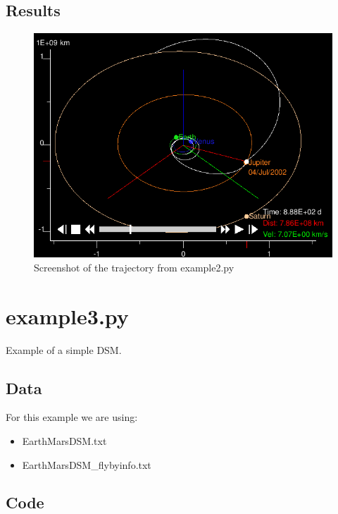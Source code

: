 \documentclass[a4paper,11pt]{article}
\begin{document}
\subsection{Results}
\begin{figure}[H]
\centering
\includegraphics[width=1\textwidth]{img/example2}
\caption{Screenshot of the trajectory from example2.py}
\label{img:example2}
\end{figure}


\newpage
\section{example3.py}
Example of a simple \gls{DSM}.
\subsection{Data}
For this example we are using:

\begin{itemize}
\item EarthMarsDSM.txt
\item EarthMarsDSM\_flybyinfo.txt
\end{itemize}
\subsection{Code}

\end{document}
